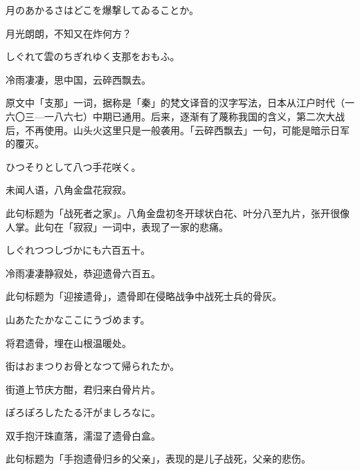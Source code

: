 \begin{haiku}
    {\FH 月のあかるさはどこを爆撃してゐることか。}

    {\FK 月光朗朗，不知又在炸何方？}
\end{haiku}

\begin{haiku}
    {\FH しぐれて雲のちぎれゆく支那をおもふ。}

    {\FK 冷雨凄凄，思中国，云碎西飘去。}

    {\FS 原文中「支那」一词，据称是「秦」的梵文译音的汉字写法，日本从江户时代（一六〇三—一八六七）中期已通用。后来，逐渐有了蔑称我国的含义，第二次大战后，不再使用。山头火这里只是一般袭用。「云碎西飘去」一句，可能是暗示日军的覆灭。}
\end{haiku}

\begin{haiku}
    {\FH ひつそりとして八つ手花咲く。}

    {\FK 未闻人语，八角金盘花寂寂。}

    {\FS 此句标题为「战死者之家」。八角金盘初冬开球状白花、叶分八至九片，张开很像人掌。此句在「寂寂」一词中，表现了一家的悲痛。}
\end{haiku}

\begin{haiku}
    {\FH しぐれつつしづかにも六百五十。}

    {\FK 冷雨凄凄静寂处，恭迎遗骨六百五。}

    {\FS 此句标题为「迎接遗骨」，遗骨即在侵略战争中战死士兵的骨灰。}
\end{haiku}

\begin{haiku}
    {\FH 山あたたかなここにうづめます。}

    {\FK 将君遗骨，埋在山根温暖处。}
\end{haiku}

\begin{haiku}
    {\FH 街はおまつりお骨となつて帰られたか。}

    {\FK 街道上节庆方酣，君归来白骨片片。}
\end{haiku}

\begin{haiku}
    {\FH ぽろぽろしたたる汗がましろなに。}

    {\FK 双手抱汗珠直落，濡湿了遗骨白盒。}

    {\FS 此句标题为「手抱遗骨归乡的父亲」，表现的是儿子战死，父亲的悲伤。}
\end{haiku}

